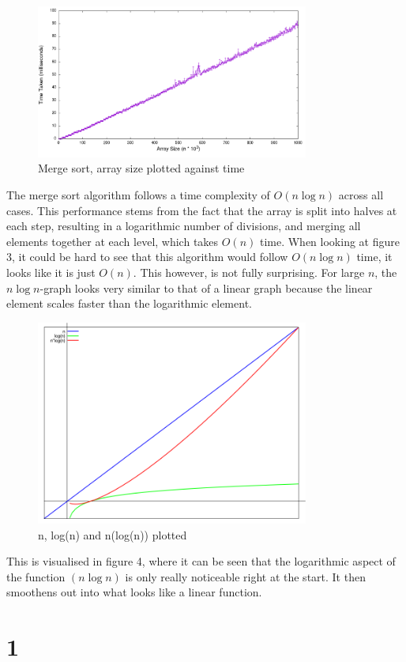 \documentclass[a4paper,11pt]{article}
\begin{document}
\begin{figure}[h!]
    \centering
    \includegraphics[width=0.8\textwidth]{MergeSort_plot}
    \caption{Merge sort, array size plotted against time}
    \label{fig:MergeSort_plot}
\end{figure}

The merge sort algorithm follows a time complexity of $O(n \log n)$ across all cases.
This performance stems from the fact that the array is split into halves at each step,
resulting in a logarithmic number of divisions, and merging all elements together at each level,
which takes $O(n)$ time.
When looking at figure 3, it could be hard to see that this algorithm would follow $O(n \log n)$ time,
it looks like it is just $O(n)$.
This however, is not fully surprising.
For large $n$, the $n \log n$-graph looks very similar to that of a linear graph because the linear element scales faster than the logarithmic element.

\begin{figure}[h!]
    \centering
    \includegraphics[width=0.8\textwidth]{growth_plot}
    \caption{n, log(n) and n(log(n)) plotted}
    \label{fig:growth_plot}
\end{figure}

This is visualised in figure 4, where it can be seen that the logarithmic aspect of the function $(n \log n)$ is only really
noticeable right at the start.
It then smoothens out into what looks like a linear function.


\section*{1}
\end{document}
